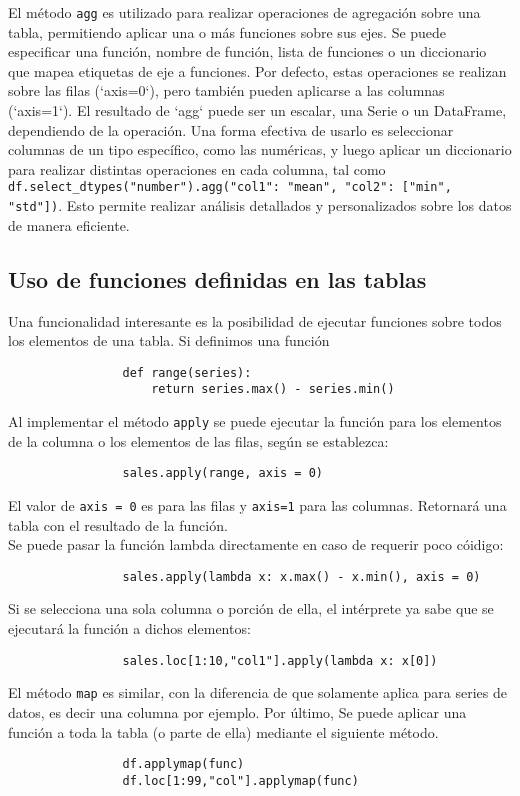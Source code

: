             El método \texttt{agg} es utilizado para realizar operaciones de agregación sobre una tabla, permitiendo aplicar una o más funciones sobre sus ejes. Se puede especificar una función, nombre de función, lista de funciones o un diccionario que mapea etiquetas de eje a funciones. Por defecto, estas operaciones se realizan sobre las filas (`axis=0`), pero también pueden aplicarse a las columnas (`axis=1`). El resultado de `agg` puede ser un escalar, una Serie o un DataFrame, dependiendo de la operación. Una forma efectiva de usarlo es seleccionar columnas de un tipo específico, como las numéricas, y luego aplicar un diccionario para realizar distintas operaciones en cada columna, tal como \texttt{df.select\_dtypes("number").agg({"col1": "mean", "col2": ["min", "std"]})}. Esto permite realizar análisis detallados y personalizados sobre los datos de manera eficiente.

        \subsection{Uso de funciones definidas en las tablas}

            \noindent Una funcionalidad interesante es la posibilidad de ejecutar funciones sobre todos los elementos de una tabla. Si definimos una función
            \begin{verbatim}
                def range(series):
                    return series.max() - series.min()
            \end{verbatim}
            \noindent Al implementar el método \texttt{apply} se puede ejecutar la función para los elementos de la columna o los elementos de las filas, según se establezca:
            \begin{verbatim}
                sales.apply(range, axis = 0)
            \end{verbatim}
            El valor de \texttt{axis = 0} es para las filas y \texttt{axis=1} para las columnas. Retornará una tabla con el resultado de la función. \\
            \noindent Se puede pasar la función lambda directamente en caso de requerir poco cóidigo:
            \begin{verbatim}
                sales.apply(lambda x: x.max() - x.min(), axis = 0)
            \end{verbatim}
            Si se selecciona una sola columna o porción de ella, el intérprete ya sabe que se ejecutará la función a dichos elementos:
            \begin{verbatim}
                sales.loc[1:10,"col1"].apply(lambda x: x[0])
            \end{verbatim}
            \noindent El método \texttt{map} es similar, con la diferencia de que solamente aplica para series de datos, es decir una columna por ejemplo. Por último, Se puede aplicar una función a toda la tabla (o parte de ella) mediante el siguiente método.
            \begin{verbatim}
                df.applymap(func)
                df.loc[1:99,"col"].applymap(func)
            \end{verbatim}

